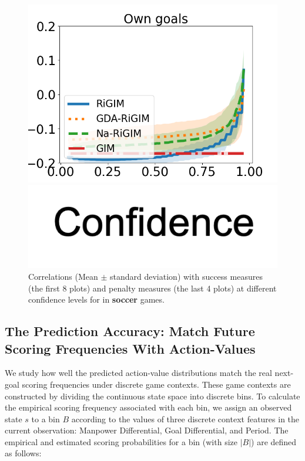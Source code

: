 \documentclass{article}
\newcommand{\state}{s}
\newcommand{\bin}{B}
\begin{document}
\begin{figure}[htbp]
\begin{minipage}{0.16\textwidth}
    \includegraphics[scale=0.14]{figures/soccer_risk_curve_OwnG_shadow.png}\par
    \vspace{-0.05in}
    \includegraphics[scale=0.12]{figures/confidence_x_label.png}
    \end{minipage}
    \vspace{-0.1in}
    \caption{Correlations (Mean $\pm$ standard deviation) with success measures (the first 8 plots) and penalty measures (the last 4 plots) at different confidence levels for in {\bf soccer} games.}\label{fig:risk-sensitivity-soccer}
    \vspace{-0.2in}
\end{figure}
\subsection{The Prediction Accuracy: Match Future Scoring Frequencies With Action-Values}
\vspace{-0.05in}
We study how well the predicted action-value distributions match the real next-goal scoring frequencies under discrete game contexts. 
These game contexts are constructed by dividing the continuous state space into discrete bins. To calculate the empirical scoring frequency associated with each bin, we assign an observed state $\state$ to a bin $\bin$ according to the values of three discrete context features in the current observation: Manpower Differential, Goal Differential, and Period. The empirical and estimated scoring probabilities for a bin (with size $|\bin|$) are defined as follows:
\end{document}
